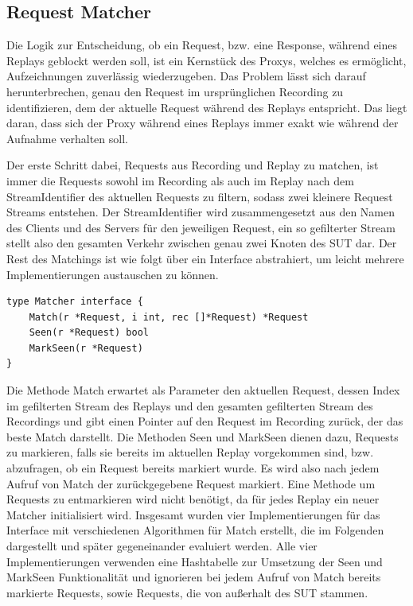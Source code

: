 \documentclass[12pt,a4paper]{report}
\begin{document}
\subsection{Request Matcher}
\label{chap:matcher}
Die Logik zur Entscheidung, ob ein Request, bzw. eine Response, während eines Replays geblockt werden soll,
ist ein Kernstück des Proxys, welches es ermöglicht, Aufzeichnungen zuverlässig wiederzugeben.
Das Problem lässt sich darauf herunterbrechen, genau den Request im ursprünglichen Recording zu identifizieren,
dem der aktuelle Request während des Replays entspricht. Das liegt daran, dass sich der Proxy während eines
Replays immer exakt wie während der Aufnahme verhalten soll.

Der erste Schritt dabei, Requests aus Recording und Replay zu matchen, ist immer die Requests sowohl im
Recording als auch im Replay nach dem StreamIdentifier des aktuellen Requests zu filtern, sodass zwei
kleinere Request Streams entstehen. Der StreamIdentifier wird zusammengesetzt aus den Namen des Clients
und des Servers für den jeweiligen Request, ein so gefilterter Stream stellt also den gesamten Verkehr
zwischen genau zwei Knoten des SUT dar.
Der Rest des Matchings ist wie folgt über ein Interface abstrahiert, um leicht mehrere Implementierungen
austauschen zu können.
\begin{lstlisting}
type Matcher interface {
   	Match(r *Request, i int, rec []*Request) *Request
   	Seen(r *Request) bool
    MarkSeen(r *Request)
}
\end{lstlisting}
Die Methode Match erwartet als Parameter den aktuellen Request, dessen Index im gefilterten Stream des Replays
und den gesamten gefilterten Stream des Recordings und gibt einen Pointer auf den Request im Recording zurück,
der das beste Match darstellt. Die Methoden Seen und MarkSeen dienen dazu, Requests zu markieren, falls sie bereits
im aktuellen Replay vorgekommen sind, bzw. abzufragen, ob ein Request bereits markiert wurde. Es wird also nach jedem Aufruf
von Match der zurückgegebene Request markiert. Eine Methode um Requests zu entmarkieren wird nicht benötigt, da für
jedes Replay ein neuer Matcher initialisiert wird. Insgesamt wurden vier Implementierungen für das Interface mit
verschiedenen Algorithmen für Match erstellt, die im Folgenden dargestellt und später gegeneinander evaluiert werden.
Alle vier Implementierungen verwenden eine Hashtabelle zur Umsetzung der Seen und MarkSeen Funktionalität und ignorieren
bei jedem Aufruf von Match bereits markierte Requests, sowie Requests, die von außerhalt des SUT stammen.
\end{document}
